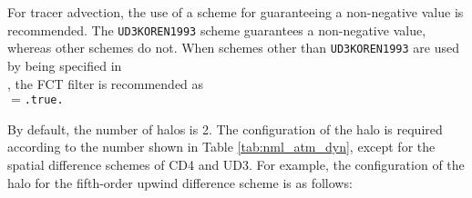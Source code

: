 For tracer advection, the use of a scheme for guaranteeing a non-negative value is recommended. 
The \verb|UD3KOREN1993| scheme guarantees a non-negative value, whereas other schemes do not. When schemes other than \verb|UD3KOREN1993| are used by being specified in \\
, the FCT filter is recommended as \\
$=$\verb|.true.|

By default, the number of halos is 2. The configuration of the halo is required according to the number shown in Table \ref{tab:nml_atm_dyn}, except for the spatial difference schemes of CD4 and UD3. For example, the configuration of the halo for the fifth-order upwind difference scheme is as follows:

